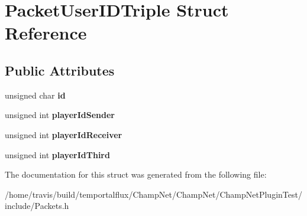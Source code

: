 \hypertarget{struct_packet_user_i_d_triple}{\section{Packet\-User\-I\-D\-Triple Struct Reference}
\label{struct_packet_user_i_d_triple}
}
\subsection*{Public Attributes}
\begin{DoxyCompactItemize}
\item 
\hypertarget{struct_packet_user_i_d_triple_a0b1062f754fdd84e60c3cb4eec5fb83b}{unsigned char {\bfseries id}}\label{struct_packet_user_i_d_triple_a0b1062f754fdd84e60c3cb4eec5fb83b}

\item 
\hypertarget{struct_packet_user_i_d_triple_a2150148f417662b9c0b8987ac8e57ef6}{unsigned int {\bfseries player\-Id\-Sender}}\label{struct_packet_user_i_d_triple_a2150148f417662b9c0b8987ac8e57ef6}

\item 
\hypertarget{struct_packet_user_i_d_triple_a1181a138b9ab0d5ee33dc3f2c33171a4}{unsigned int {\bfseries player\-Id\-Receiver}}\label{struct_packet_user_i_d_triple_a1181a138b9ab0d5ee33dc3f2c33171a4}

\item 
\hypertarget{struct_packet_user_i_d_triple_adc0ab416d757528e3d3b0fcf59414e97}{unsigned int {\bfseries player\-Id\-Third}}\label{struct_packet_user_i_d_triple_adc0ab416d757528e3d3b0fcf59414e97}

\end{DoxyCompactItemize}


The documentation for this struct was generated from the following file\-:\begin{DoxyCompactItemize}
\item 
/home/travis/build/temportalflux/\-Champ\-Net/\-Champ\-Net/\-Champ\-Net\-Plugin\-Test/include/Packets.\-h\end{DoxyCompactItemize}
